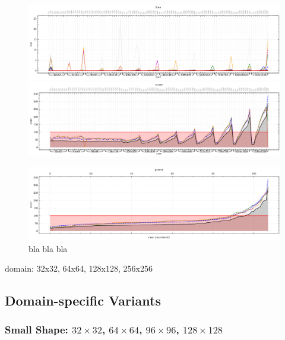 \documentclass[format=acmsmall,screen,review,authordraft,nonacm]{acmart}
\begin{document}
\begin{figure}[H]
	\centering
	\includegraphics[width=\linewidth]{../figures/figure-2-loss}
	\includegraphics[width=\linewidth]{../figures/figure-3-score}

	\includegraphics[width=\linewidth]{../figures/figure-4-power}
	\caption{bla bla bla}
	\label{fig:abstract}
\end{figure}

\begin{table}[H]
	\centering
	
	\newline
	\caption{domain: 32x32, 64x64, 128x128, 256x256}
\end{table}

\subsection{Domain-specific Variants} %

\subsubsection{Small Shape: $32\times32$, $64\times64$, $96\times96$, $128\times128$}
\end{document}
